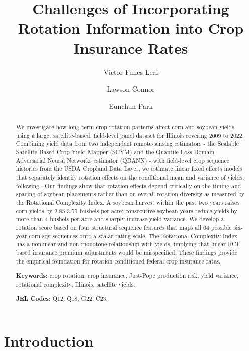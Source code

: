 \documentclass[12pt,letterpaper]{article}
\title{Challenges of Incorporating Rotation Information into Crop Insurance Rates}
\author[1]{Victor Funes-Leal}
\author[2]{Lawson Connor}
\author[3]{Eunchun Park}
\affil[1,2,3]{Department of Agricultural Economics and Agribusiness, University of Arkansas}
\date{}
\theoremstyle{remark}
\theoremstyle{plain}
\theoremstyle{definition}
\begin{document}
\maketitle
\begin{abstract}
\noindent
We investigate how long-term crop rotation patterns affect corn and soybean yields using a large, satellite-based, field-level panel dataset for Illinois covering 2009 to 2022. Combining yield data from two independent remote-sensing estimators - the Scalable Satellite-Based Crop Yield Mapper (SCYM) and the Quantile Loss Domain Adversarial Neural Networks estimator (QDANN) - with field-level crop sequence histories from the USDA Cropland Data Layer, we estimate linear fixed effects models that separately identify rotation effects on the conditional mean and variance of yields, following \citet{justPope1979}. Our findings show that rotation effects depend critically on the timing and spacing of soybean placements rather than on overall rotation diversity as measured by the Rotational Complexity Index. A soybean harvest within the past two years raises corn yields by 2.85-3.55 bushels per acre; consecutive soybean years reduce yields by more than 4 bushels per acre and sharply increase yield variance. We develop a rotation score based on four structural sequence features that maps all 64 possible six-year corn-soy sequences onto a scalar rating scale. The Rotational Complexity Index has a nonlinear and non-monotone relationship with yields, implying that linear RCI-based insurance premium adjustments would be misspecified. These findings provide the empirical foundation for rotation-conditioned federal crop insurance rates.
 
\medskip\noindent
\textbf{Keywords:} crop rotation, crop insurance, Just-Pope production risk, yield variance, rotational complexity, Illinois, satellite yields.
 
\medskip\noindent
\textbf{JEL Codes:} Q12, Q18, G22, C23.
\end{abstract}
 
\newpage
\setcounter{page}{1}
	
\section{\label{sec:intro}Introduction}
\end{document}
